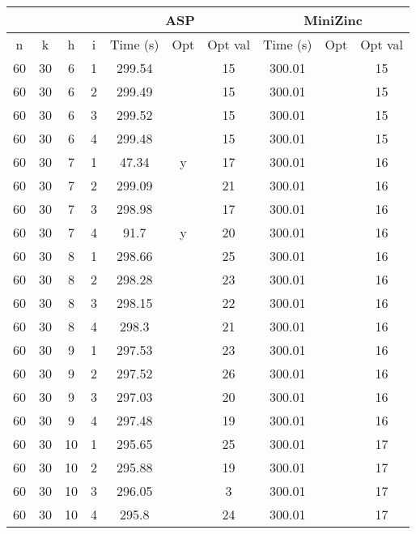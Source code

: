 \documentclass[12pt,a4paper,english,italian]{article}
\begin{document}
\begin{table}[]
	\begin{tabular}{cccc|ccc|ccc|}
		\cline{5-10}
		&    &    &   & \multicolumn{3}{c|}{ASP} & \multicolumn{3}{c|}{MiniZinc} \\ \hline
		n  & k  & h  & i & Time (s) & Opt & Opt val & Time (s)   & Opt   & Opt val  \\ \hline
		60 & 30 & 6  & 1 & 299.54   &     & 15      & 300.01     &       & 15       \\ \hline
		60 & 30 & 6  & 2 & 299.49   &     & 15      & 300.01     &       & 15       \\ \hline
		60 & 30 & 6  & 3 & 299.52   &     & 15      & 300.01     &       & 15       \\ \hline
		60 & 30 & 6  & 4 & 299.48   &     & 15      & 300.01     &       & 15       \\ \hline
		60 & 30 & 7  & 1 & 47.34    & y   & 17      & 300.01     &       & 16       \\ \hline
		60 & 30 & 7  & 2 & 299.09   &     & 21      & 300.01     &       & 16       \\ \hline
		60 & 30 & 7  & 3 & 298.98   &     & 17      & 300.01     &       & 16       \\ \hline
		60 & 30 & 7  & 4 & 91.7     & y   & 20      & 300.01     &       & 16       \\ \hline
		60 & 30 & 8  & 1 & 298.66   &     & 25      & 300.01     &       & 16       \\ \hline
		60 & 30 & 8  & 2 & 298.28   &     & 23      & 300.01     &       & 16       \\ \hline
		60 & 30 & 8  & 3 & 298.15   &     & 22      & 300.01     &       & 16       \\ \hline
		60 & 30 & 8  & 4 & 298.3    &     & 21      & 300.01     &       & 16       \\ \hline
		60 & 30 & 9  & 1 & 297.53   &     & 23      & 300.01     &       & 16       \\ \hline
		60 & 30 & 9  & 2 & 297.52   &     & 26      & 300.01     &       & 16       \\ \hline
		60 & 30 & 9  & 3 & 297.03   &     & 20      & 300.01     &       & 16       \\ \hline
		60 & 30 & 9  & 4 & 297.48   &     & 19      & 300.01     &       & 16       \\ \hline
		60 & 30 & 10 & 1 & 295.65   &     & 25      & 300.01     &       & 17       \\ \hline
		60 & 30 & 10 & 2 & 295.88   &     & 19      & 300.01     &       & 17       \\ \hline
		60 & 30 & 10 & 3 & 296.05   &     & 3       & 300.01     &       & 17       \\ \hline
		60 & 30 & 10 & 4 & 295.8    &     & 24      & 300.01     &       & 17       \\ \hline
	\end{tabular}
\end{table}
\end{document}
